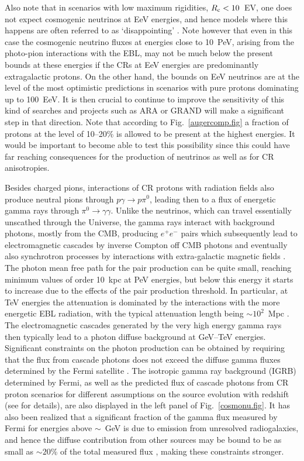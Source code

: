 \documentclass[twoside,12pt]{article}
\begin{document}
Also note that in scenarios with low maximum rigidities, $R_{\rm c}<10$~EV, one does not expect cosmogenic neutrinos at EeV energies, and hence models where this happens are often referred to as `disappointing' \cite{disap}. Note however that even in this case the cosmogenic neutrino fluxes at energies close to 10~PeV, arising from the photo-pion interactions with the EBL, may not be much below the present bounds at these energies if the CRs at EeV energies are predominantly extragalactic protons.
On the other hand, the bounds on EeV neutrinos are at the level of the most optimistic predictions in scenarios with pure protons dominating up to 100~EeV. It is then crucial  to continue to improve the sensitivity of this kind of searches and projects such as ARA \cite{ara} or GRAND \cite{grand} will make a significant step in that direction. Note that according to Fig.~\ref{augercomp.fig} a fraction of protons at the level of 10--20\% is allowed to be present at the highest energies. It would be important to become able to test this possibility since this could have far reaching consequences for the production of neutrinos as well as for CR anisotropies. 


Besides charged pions, interactions of CR protons with radiation fields also produce neutral pions  through $p\gamma\to p\pi^0$, leading then to a flux of energetic gamma rays through  $\pi^0\to\gamma\gamma$. Unlike the neutrinos, which can travel essentially unscathed through the Universe, the gamma rays interact with background photons, mostly from the CMB, producing $e^+e^-$ pairs which subsequently lead to electromagnetic cascades by inverse Compton off CMB photons and eventually also synchrotron processes by interactions with extra-galactic magnetic fields \cite{cascadegamma}. The photon mean free path for the pair production can be quite small, reaching minimum values of order 10~kpc at PeV energies, but below this energy it starts to increase due to the effects of the pair production threshold. In particular, at TeV energies the attenuation is dominated by the interactions with the more energetic EBL radiation, with the typical attenuation length being $\sim 10^2$~Mpc \cite{co97}. The electromagnetic cascades generated by the very high energy gamma rays then  typically lead to a photon diffuse background at GeV--TeV energies. Significant constraints on the photon production can be obtained by requiring that the flux from cascade photons does not exceed the diffuse gamma fluxes determined by the Fermi satellite \cite{fermibound}. The   isotropic gamma ray background (IGRB) determined by Fermi, as well as the predicted flux of cascade photons from CR proton scenarios for different assumptions on the source evolution with redshift (see \cite{cosmonu} for details), are also displayed in the left panel of Fig.~\ref{cosmonu.fig}. It has also been realized that a significant fraction of the gamma flux measured by Fermi for energies above $\sim$~GeV is due to emission from unresolved radiogalaxies, and hence the diffuse contribution from other sources may be bound to be as small as $\sim 20$\% of the total measured flux \cite{fermiresolved,ho16}, making these constraints stronger. 
\end{document}
